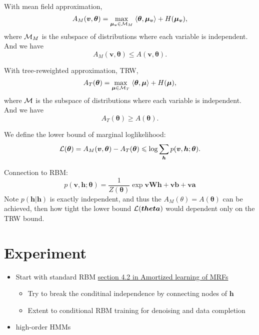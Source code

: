 With mean field approximation,
\begin{equation}
  A_{M}(\bm{v}, \bm{\theta}) = \underset{\bm{\mu}_{\bm{v}} \in \mathcal{M}_M}{\max}\;{ \langle {\bm{\theta}, \bm{\mu}_{\bm{v}}} \rangle + H(\bm{\mu}_{\bm{v}})},
\end{equation}
where $\mathcal{M}_M$ is the subspace of distributions where each variable is independent. And we have
\begin{equation}
  A_{M}(\bm{v}, \bm{\theta}) \leq A(\bm{v}, \bm{\theta}).
\end{equation}

With tree-reweighted approximation, TRW,
\begin{equation}
  A_{T}(\bm{\theta}) = \underset{\bm{\mu} \in \mathcal{M}_T}{\max}\;{ \langle {\bm{\theta}, \bm{\mu}} \rangle + H(\bm{\mu})},
\end{equation}
where $\mathcal{M}$ is the subspace of distributions where each variable is independent. And we have
\begin{equation}
  A_{T}(\bm{\theta}) \geq A( \bm{\theta}).
\end{equation}

We define the lower bound of marginal loglikelihood:
\begin{equation}
  \mathcal{L}(\bm{\theta}) = A_{M}(\bm{v}, \bm{\theta}) - A_{T}(\bm{\theta}) \leqslant \log\sum_{\bm{h}}p(\bm{v}, \bm{h}; \bm{\theta}).
\end{equation}

Connection to RBM:
\begin{equation}
  p(\bm{v}, \bm{h}; \bm{\theta}) = \frac{1}{Z(\bm{\theta})} \exp{\bm{v}\bm{W}\bm{h} + \bm{v}\bm{b} + \bm{v}\bm{a}}
\end{equation}
Note $p(\bm{h}|\bm{h})$ is exactly independent, and thus the $A_{M}(\theta) = A(\bm{\theta})$ can be achieved, then how tight the lower bound $\mathcal{L}(\bm{theta})$ would dependent only on the TRW bound.

\section{Experiment}
\begin{itemize}
\item Start with standard RBM \href{https://papers.nips.cc/paper/9687-amortized-bethe-free-energy-minimization-for-learning-mrfs.pdf}{section 4.2 in Amortized learning of MRFs}
  \begin{itemize}
  \item Try to break the conditinal independence by connecting nodes of $\bm{h}$
  \item Extent to conditional RBM training for denoising and data completion
  \end{itemize}
\item high-order HMMs

\end{itemize}




